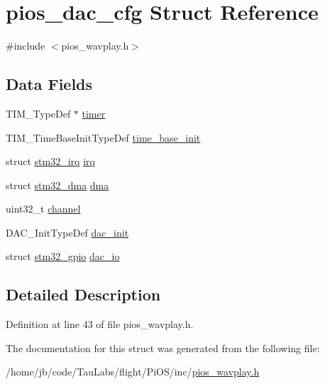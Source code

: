 \hypertarget{structpios__dac__cfg}{\section{pios\-\_\-dac\-\_\-cfg \-Struct \-Reference}
\label{structpios__dac__cfg}
}


{\ttfamily \#include $<$pios\-\_\-wavplay.\-h$>$}

\subsection*{\-Data \-Fields}
\begin{DoxyCompactItemize}
\item 
\-T\-I\-M\-\_\-\-Type\-Def $\ast$ \hyperlink{group___p_i_o_s___w_a_v_p_l_a_y_ga06b2a838489fd6bb8f48615002e024d8}{timer}
\item 
\-T\-I\-M\-\_\-\-Time\-Base\-Init\-Type\-Def \hyperlink{group___p_i_o_s___w_a_v_p_l_a_y_ga1568b0926bb1e178d06682a8495e0f40}{time\-\_\-base\-\_\-init}
\item 
struct \hyperlink{structstm32__irq}{stm32\-\_\-irq} \hyperlink{group___p_i_o_s___w_a_v_p_l_a_y_ga1db4430fc674d954d396ce5abf14307c}{irq}
\item 
struct \hyperlink{structstm32__dma}{stm32\-\_\-dma} \hyperlink{group___p_i_o_s___w_a_v_p_l_a_y_ga9794db8fe6627bb998ba905f5ec5b869}{dma}
\item 
uint32\-\_\-t \hyperlink{group___p_i_o_s___w_a_v_p_l_a_y_ga197e2e3664b092f223251af8db017392}{channel}
\item 
\-D\-A\-C\-\_\-\-Init\-Type\-Def \hyperlink{group___p_i_o_s___w_a_v_p_l_a_y_ga2da6286f80191750fd6960a67d4a1e20}{dac\-\_\-init}
\item 
struct \hyperlink{structstm32__gpio}{stm32\-\_\-gpio} \hyperlink{group___p_i_o_s___w_a_v_p_l_a_y_gae02d1c0fa0764b2cf3172a8d3582295f}{dac\-\_\-io}
\end{DoxyCompactItemize}


\subsection{\-Detailed \-Description}


\-Definition at line 43 of file pios\-\_\-wavplay.\-h.



\-The documentation for this struct was generated from the following file\-:\begin{DoxyCompactItemize}
\item 
/home/jb/code/\-Tau\-Labs/flight/\-Pi\-O\-S/inc/\hyperlink{pios__wavplay_8h}{pios\-\_\-wavplay.\-h}\end{DoxyCompactItemize}
